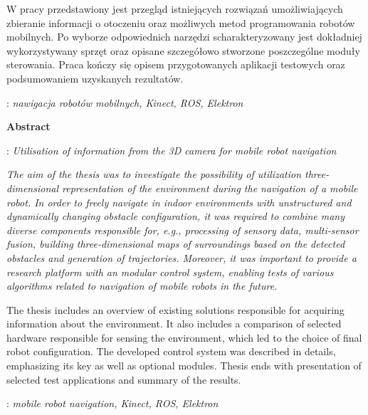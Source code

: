 \begin{titlepage}
{    W pracy przedstawiony jest przegląd istniejących rozwiązań umożliwiających
    zbieranie informacji o otoczeniu oraz możliwych metod programowania
    robotów mobilnych. Po wyborze odpowiednich narzędzi scharakteryzowany jest
    dokładniej wykorzystywany sprzęt oraz opisane szczegółowo stworzone poszczególne
    moduły sterowania. Praca kończy się opisem przygotowanych aplikacji testowych
    oraz podsumowaniem uzyskanych rezultatów.
    }
    \vspace*{1\baselineskip}

    : {\itshape nawigacja robotów mobilnych, Kinect, ROS, Elektron }
    \par
    \vspace{4\baselineskip}
    \begin{center}
	{\large\bfseries Abstract}\par\bigskip
    \end{center}
    : {\itshape Utilisation of information from the 3D camera for mobile robot navigation}\par
    \vspace*{1\baselineskip}
    {\itshape
    The aim of the thesis was to investigate the possibility of
     utilization three-dimensional representation of the environment during
     the navigation of a mobile robot.
     In order to freely navigate in indoor environments with unstructured
     and dynamically changing obstacle configuration, it was required to
     combine many diverse components responsible for, e.g., processing of
     sensory data, multi-sensor fusion, building three-dimensional maps of
     surroundings based on the detected obstacles and generation of
     trajectories.
     Moreover, it was important to provide a research platform with an
     modular control system, enabling tests of various algorithms related
     to navigation of mobile robots in the future.

     The thesis includes an overview of existing solutions responsible for
     acquiring information about the environment. It also includes a
     comparison of selected hardware responsible for sensing the
     environment, which led to the choice of final robot configuration. The
     developed control system was described in details, emphasizing its key
     as well as optional modules. Thesis ends with presentation of selected
     test applications and summary of the results.
    }
    \vspace*{1\baselineskip}

    : {\itshape mobile robot navigation, Kinect, ROS, Elektron}

\end{titlepage}
